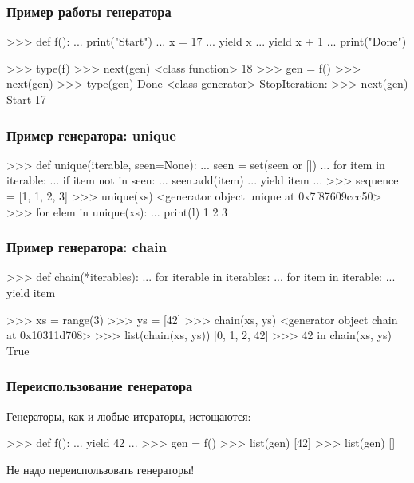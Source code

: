 \documentclass[fleqn, xcolor=x11names]{beamer}
\begin{document}
\begin{frame}[fragile]\frametitle{Пример работы генератора}
\begin{pcode}
>>> def f():
...     print("Start")
...     x = 17
...     yield x
...     yield x + 1
...     print("Done")
\end{pcode}

\hfill

\begin{pcode}
>>> type(f)              >>> next(gen)
<class function>         18
>>> gen = f()            >>> next(gen)
>>> type(gen)            Done
<class generator>        StopIteration:
>>> next(gen)            
Start                    
17                       
\end{pcode}

\end{frame}

\begin{frame}[fragile]\frametitle{Пример генератора: unique}
\begin{pcode}
>>> def unique(iterable, seen=None):
...     seen = set(seen or [])
...     for item in iterable:
...         if item not in seen:
...             seen.add(item)
...             yield item
...
>>> sequence = [1, 1, 2, 3]
>>> unique(xs)
<generator object unique at 0x7f87609ccc50>
>>> for elem in unique(xs):
...     print(l)
1
2
3
\end{pcode}
\end{frame}

\begin{frame}[fragile]\frametitle{Пример генератора: chain}
\begin{pcode}
>>> def chain(*iterables):
...     for iterable in iterables:
...         for item in iterable:
...             yield item
\end{pcode}

\begin{pcode}
>>> xs = range(3)
>>> ys = [42]
>>> chain(xs, ys)
<generator object chain at 0x10311d708>
>>> list(chain(xs, ys))
[0, 1, 2, 42]
>>> 42 in chain(xs, ys)
True
\end{pcode}
\end{frame}

\begin{frame}[fragile]\frametitle{Переиспользование генератора}
Генераторы, как и любые итераторы, истощаются:
\begin{pcode}
>>> def f():
...     yield 42
...
>>> gen = f()
>>> list(gen)
[42]
>>> list(gen) 
[]
\end{pcode}

\hfill

Не надо переиспользовать генераторы!
\end{frame}
\end{document}
